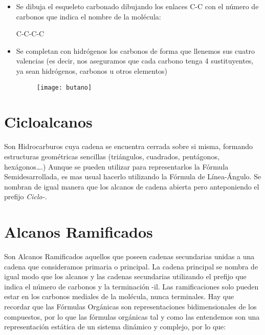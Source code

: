 \begin{itemize}
	\item Se dibuja el esqueleto carbonado dibujando los enlaces C-C con el número de carbonos que indica el nombre de la molécula:
	\begin{center}
		C-C-C-C
	\end{center}
	\item Se completan con hidrógenos los carbonos de forma que llenemos sus cuatro valencias (es decir, nos aseguramos que cada carbono tenga 4 sustituyentes, ya sean hidrógenos, carbonos u otros elementos)
	\begin{figure}[h!]
		\centering
		\texttt{[image: butano]}
	\end{figure}
	
\end{itemize}
\section{Cicloalcanos}
Son Hidrocarburos cuya cadena se encuentra cerrada sobre si misma, formando estructuras geométricas sencillas (triángulos, cuadrados, pentágonos, hexágonos….)
Aunque se pueden utilizar para representarlos la Fórmula Semidesarrollada, es mas usual hacerlo utilizando la Fórmula de Línea-Ángulo. Se nombran de igual manera que los alcanos de cadena abierta pero anteponiendo el prefijo \emph{Ciclo-}.
\begin{figure}[h!]
	\centering
	\hspace{2cm}
	\hspace{2cm}
\end{figure}

\section{Alcanos Ramificados}
Son Alcanos Ramificados aquellos que poseen cadenas secundarias unidas a una cadena que consideramos primaria o principal. La cadena principal se nombra de igual modo que los alcanos y las cadenas secundarias utilizando el prefijo que indica el número de carbonos y la terminación -il. Las ramificaciones solo pueden estar en los carbonos mediales de la molécula, nunca terminales. Hay que recordar que las Fórmulas Orgánicas son representaciones bidimensionales de los compuestos, por lo que las fórmulas orgánicas tal y como las entendemos son una representación estática de un sistema dinámico y complejo, por lo que:

